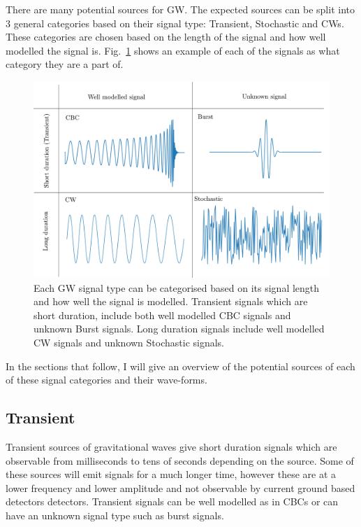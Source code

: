 There are many potential sources for \ac{GW}. The expected sources can be split into 3 general categories based on their signal type: Transient, Stochastic and \acp{CW}.
These categories are chosen based on the length of the signal and how well modelled the signal is.
Fig.~\ref{intro:sources:signaltypes} shows an example of each of the signals as what category they are a part of.
%
\begin{figure}[h]
    \centering
    \includegraphics[width=\textwidth]{C1_intro/sources_types.pdf}
    \caption{Each \ac{GW} signal type can be categorised based on its signal length and how well the signal is modelled. Transient signals which are short duration, include both well modelled \ac{CBC} signals and unknown Burst signals. Long duration signals include well modelled \ac{CW} signals and unknown Stochastic signals.}
    \label{intro:sources:signaltypes}
\end{figure}
In the sections that follow, I will give an overview of the potential sources of each of these signal categories and their wave-forms.


\subsection{\label{sources:transient} Transient}

Transient sources of gravitational waves give short duration signals which are observable from milliseconds to tens of seconds depending on the source. 
Some of these sources will emit signals for a much longer time, however these are at a lower frequency and lower amplitude and not observable by current ground based detectors detectors.
Transient signals can be well modelled as in \acp{CBC} or can have an unknown signal type such as burst signals.

